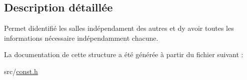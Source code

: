 \subsection{Description détaillée}
Permet d\textquotesingle{}identifié les salles indépendament des autres et d\textquotesingle{}y avoir toutes les informations nécessaire indépendamment chacune. 

La documentation de cette structure a été générée à partir du fichier suivant \+:\begin{DoxyCompactItemize}
\item 
src/\hyperlink{const_8h}{const.\+h}\end{DoxyCompactItemize}
